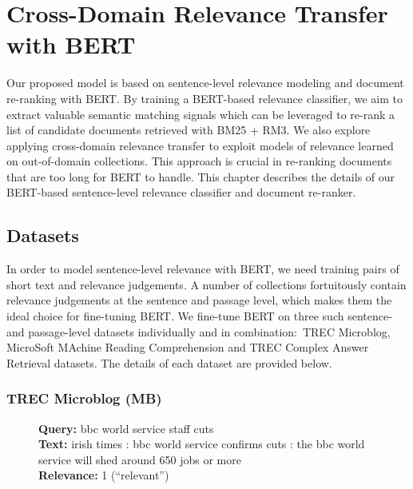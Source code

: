\chapter{Cross-Domain Relevance Transfer with BERT}
\label{ch:model}


Our proposed model is based on sentence-level relevance modeling and document re-ranking with BERT.
By training a BERT-based relevance classifier, we aim to extract valuable semantic matching signals which can be leveraged to re-rank a list of candidate documents retrieved with BM25 + RM3.
We also explore applying cross-domain relevance transfer to exploit models of relevance learned on out-of-domain collections.
This approach is crucial in re-ranking documents that are too long for BERT to handle.
This chapter describes the details of our BERT-based sentence-level relevance classifier and document re-ranker.

\section{Datasets}


In order to model sentence-level relevance with BERT, we need training pairs of short text and relevance judgements.
A number of collections fortuitously contain relevance judgements at the sentence and passage level, which makes them the ideal choice for fine-tuning BERT.
We fine-tune BERT on three such sentence- and passage-level datasets individually and in combination:\ TREC Microblog, MicroSoft MAchine Reading Comprehension and TREC Complex Answer Retrieval datasets.
The details of each dataset are provided below.

\subsection{TREC Microblog (MB)}

\begin{figure}[b!]
	\begin{framed}
		\centering
    		\textbf{Query:} bbc world service staff cuts \\
    		\textbf{Text:} irish times : bbc world service confirms cuts : the bbc world service will shed around 650 jobs or more \\
    		\textbf{Relevance:} 1 (``relevant'')
	\end{framed}
\label{mb-example}
 \caption{}
\end{figure}

